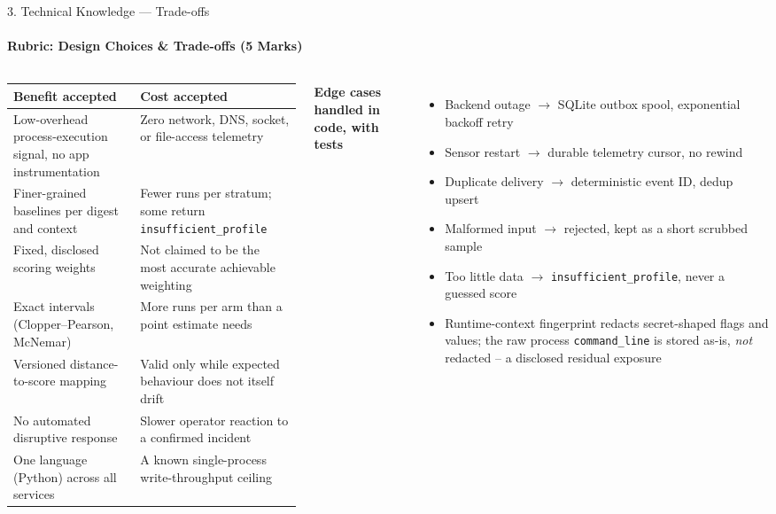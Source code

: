 \documentclass[aspectratio=169, 11pt]{beamer}
\begin{document}
\begin{frame}{3. Technical Knowledge --- Trade-offs}
\framesubtitle{Rubric: Design Choices \& Trade-offs (5 Marks)}

\begin{columns}[T,onlytextwidth]
\scriptsize
\renewcommand{\arraystretch}{1.05}
\begin{tabular}{@{}p{3.2cm}p{4.2cm}@{}}
\toprule
\textbf{Benefit accepted} & \textbf{Cost accepted} \\
\midrule
Low-overhead process-execution signal, no app instrumentation
& Zero network, DNS, socket, or file-access telemetry \\
Finer-grained baselines per digest and context
& Fewer runs per stratum; some return \texttt{insufficient\_profile} \\
Fixed, disclosed scoring weights
& Not claimed to be the most accurate achievable weighting \\
Exact intervals (Clopper--Pearson, McNemar)
& More runs per arm than a point estimate needs \\
Versioned distance-to-score mapping
& Valid only while expected behaviour does not itself drift \\
No automated disruptive response
& Slower operator reaction to a confirmed incident \\
One language (Python) across all services
& A known single-process write-throughput ceiling \\
\bottomrule
\end{tabular}

\scriptsize
\textbf{Edge cases handled in code, with tests}
\begin{itemize}\setlength\itemsep{2pt}
  \item Backend outage $\rightarrow$ SQLite outbox spool, exponential
  backoff retry
  \item Sensor restart $\rightarrow$ durable telemetry cursor, no rewind
  \item Duplicate delivery $\rightarrow$ deterministic event ID, dedup upsert
  \item Malformed input $\rightarrow$ rejected, kept as a short scrubbed
  sample
  \item Too little data $\rightarrow$ \texttt{insufficient\_profile}, never a
  guessed score
  \item Runtime-context fingerprint redacts secret-shaped flags and values;
  the raw process \texttt{command\_line} is stored as-is, \emph{not}
  redacted -- a disclosed residual exposure
\end{itemize}
\end{columns}
\end{frame}
\end{document}
